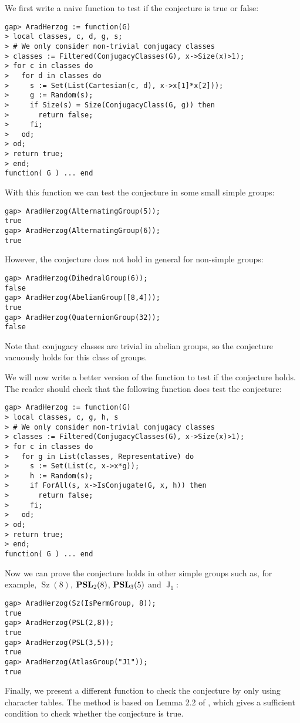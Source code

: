 \begin{example}
We first write a naive function to test if the 
conjecture is true or false:
\begin{lstlisting}
gap> AradHerzog := function(G)
> local classes, c, d, g, s;
> # We only consider non-trivial conjugacy classes
> classes := Filtered(ConjugacyClasses(G), x->Size(x)>1);
> for c in classes do
>   for d in classes do
>     s := Set(List(Cartesian(c, d), x->x[1]*x[2]));
>     g := Random(s);
>     if Size(s) = Size(ConjugacyClass(G, g)) then
>       return false;
>     fi;
>   od;
> od;
> return true;
> end;
function( G ) ... end
\end{lstlisting}
With this function we can test the conjecture
in some small simple groups:
\begin{lstlisting}
gap> AradHerzog(AlternatingGroup(5));
true
gap> AradHerzog(AlternatingGroup(6));
true
\end{lstlisting}
However, the conjecture does not hold in general for non-simple groups:
\begin{lstlisting}
gap> AradHerzog(DihedralGroup(6));
false
gap> AradHerzog(AbelianGroup([8,4]));
true
gap> AradHerzog(QuaternionGroup(32));
false
\end{lstlisting}
Note that conjugacy classes are trivial in abelian groups, so the conjecture vacuously holds for this class of groups.

We will now write a better version of 
the function to test if the conjecture holds. The reader
should check that the following function 
does test the conjecture:
\begin{lstlisting}
gap> AradHerzog := function(G)
> local classes, c, g, h, s
> # We only consider non-trivial conjugacy classes
> classes := Filtered(ConjugacyClasses(G), x->Size(x)>1);
> for c in classes do
>   for g in List(classes, Representative) do
>     s := Set(List(c, x->x*g));
>     h := Random(s);
>     if ForAll(s, x->IsConjugate(G, x, h)) then
>       return false;
>     fi;
>   od;
> od;
> return true;
> end;
function( G ) ... end
\end{lstlisting}
Now we can prove the conjecture holds
in other simple groups such as, for example, 
$\operatorname{Sz}(8)$, 
$\mathbf{PSL}_2(8)$, $\mathbf{PSL}_3(5)$ and $\operatorname{J}_1$:
\begin{lstlisting}
gap> AradHerzog(Sz(IsPermGroup, 8));
true
gap> AradHerzog(PSL(2,8));
true
gap> AradHerzog(PSL(3,5));
true
gap> AradHerzog(AtlasGroup("J1"));
true
\end{lstlisting}
Finally, we present a different function to check the conjecture by only
using character tables. 
The method is based on Lemma 2.2 of \cite{MR3003939}, which gives
a sufficient condition to check whether the conjecture is true. 


\end{example}
